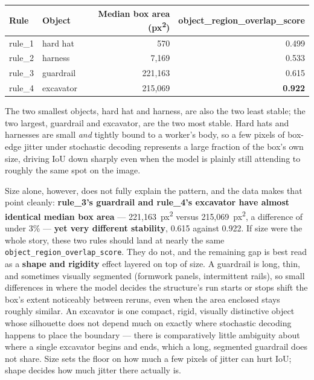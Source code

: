 \begin{center}
\begin{tabular}{llrr}
\toprule
\textbf{Rule} & \textbf{Object} & \textbf{Median box area (px\textsuperscript{2})} & \textbf{object\_region\_overlap\_score} \\
\midrule
rule\_1 & hard hat & 570 & 0.499 \\
rule\_2 & harness & 7{,}169 & 0.533 \\
rule\_3 & guardrail & 221{,}163 & 0.615 \\
rule\_4 & excavator & 215{,}069 & \textbf{0.922} \\
\bottomrule
\end{tabular}
\end{center}

The two smallest objects, hard hat and harness, are also the two least stable; the two largest,
guardrail and excavator, are the two most stable. Hard hats and harnesses are small \emph{and}
tightly bound to a worker's body, so a few pixels of box-edge jitter under stochastic decoding
represents a large fraction of the box's own size, driving IoU down sharply even when the model is
plainly still attending to roughly the same spot on the image.

Size alone, however, does not fully explain the pattern, and the data makes that point cleanly:
\textbf{rule\_3's guardrail and rule\_4's excavator have almost identical median box area} ---
221,163~px\textsuperscript{2} versus 215,069~px\textsuperscript{2}, a difference of under 3\% ---
\textbf{yet very different stability}, 0.615 against 0.922. If size were the whole story, these two
rules should land at nearly the same \texttt{object\_region\_overlap\_score}. They do not, and the
remaining gap is best read as a \textbf{shape and rigidity} effect layered on top of size. A
guardrail is long, thin, and sometimes visually segmented (formwork panels, intermittent rails),
so small differences in where the model decides the structure's run starts or stops shift the
box's extent noticeably between reruns, even when the area enclosed stays roughly similar. An
excavator is one compact, rigid, visually distinctive object whose silhouette does not depend much
on exactly where stochastic decoding happens to place the boundary --- there is comparatively
little ambiguity about where a single excavator begins and ends, which a long, segmented guardrail
does not share. Size sets the floor on how much a few pixels of jitter can hurt IoU; shape decides
how much jitter there actually is.


